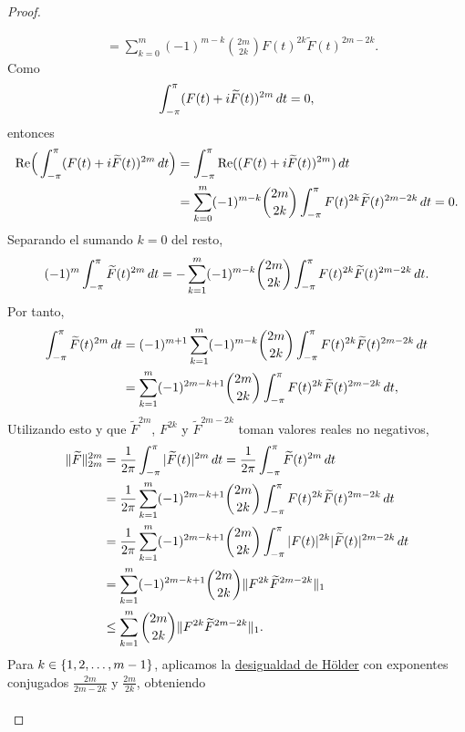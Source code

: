 \documentclass[a4paper, 12pt, oneside]{book}
\begin{document}
\begin{proof}
\begin{itemize}
\begin{align*}
            &= \sum_{k=0}^{m}(-1)^{m-k} \binom{2m}{2k}F(t)^{2k}\widetilde{F}(t)^{2m-2k}.
        \end{align*}
        Como
        \[\int_{-\pi}^{\pi} (F(t)+i\widetilde{F}(t))^{2m} \, dt = 0,\]
        entonces
        \begin{align*}
            \textup{Re}\Bigl(\,\int_{-\pi}^{\pi} (F(t)+i\widetilde{F}(t))^{2m} \, dt\Bigr) &= \int_{-\pi}^{\pi} \textup{Re}((F(t)+i\widetilde{F}(t))^{2m}) \, dt \\ 
            &= \sum_{k=0}^{m}(-1)^{m-k}\binom{2m}{2k}\int_{-\pi}^{\pi} F(t)^{2k}\widetilde{F}(t)^{2m-2k} \, dt = 0.
        \end{align*}
        Separando el sumando $k = 0$ del resto,
        \[(-1)^m\int_{-\pi}^{\pi} \widetilde{F}(t)^{2m} \, dt = -\sum_{k=1}^{m}(-1)^{m-k}\binom{2m}{2k}\int_{-\pi}^{\pi} F(t)^{2k}\widetilde{F}(t)^{2m-2k} \, dt.\]
        Por tanto,
        \begin{align*}
            \int_{-\pi}^{\pi} \widetilde{F}(t)^{2m} \, dt &= (-1)^{m+1}\sum_{k=1}^{m}(-1)^{m-k}\binom{2m}{2k}\int_{-\pi}^{\pi} F(t)^{2k}\widetilde{F}(t)^{2m-2k} \, dt \\
            &= \sum_{k=1}^{m}(-1)^{2m-k+1}\binom{2m}{2k}\int_{-\pi}^{\pi} F(t)^{2k}\widetilde{F}(t)^{2m-2k} \, dt,
        \end{align*}
        Utilizando esto y que $\widetilde{F}^{2m}$, $F^{2k}$ y $\widetilde{F}^{2m-2k}$ toman valores reales no negativos,
        \begin{align*}
            \|\widetilde{F}\|_{2m}^{2m} &= \frac{1}{2\pi}\int_{-\pi}^{\pi} |\widetilde{F}(t)|^{2m} \, dt = \frac{1}{2\pi}\int_{-\pi}^{\pi} \widetilde{F}(t)^{2m} \, dt \\
            &= \frac{1}{2\pi}\sum_{k=1}^{m}(-1)^{2m-k+1}\binom{2m}{2k}\int_{-\pi}^{\pi} F(t)^{2k}\widetilde{F}(t)^{2m-2k} \, dt \\
            &= \frac{1}{2\pi}\sum_{k=1}^{m}(-1)^{2m-k+1}\binom{2m}{2k}\int_{-\pi}^{\pi} |F(t)|^{2k}|\widetilde{F}(t)|^{2m-2k} \, dt \\
            &=\sum_{k=1}^{m}(-1)^{2m-k+1}\binom{2m}{2k}\|F^{2k}\widetilde{F}^{2m-2k}\|_1 \\
            &\leq \sum_{k=1}^{m}\binom{2m}{2k}\|F^{2k}\widetilde{F}^{2m-2k}\|_1.
        \end{align*}
        Para $k\in\{1,2,\mathellipsis,m-1\}$, aplicamos la \hyperref[1.1.1]{\color{blue}desigualdad de Hölder} con exponentes conjugados $\frac{2m}{2m-2k}$ y $\frac{2m}{2k}$, obteniendo
        \begin{align*}

\end{align*}
\end{itemize}
\end{proof}
\end{document}
